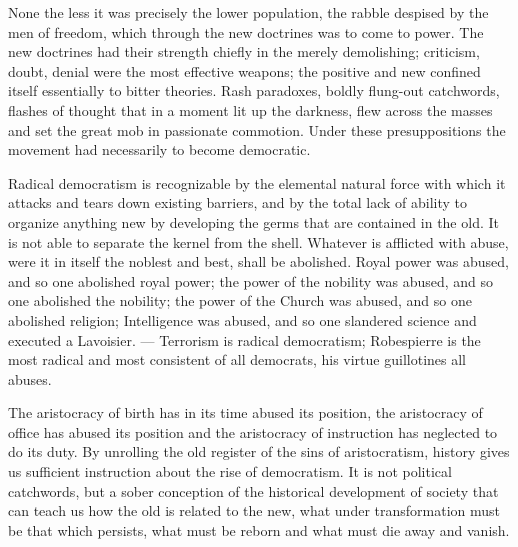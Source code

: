 \documentclass[12pt,a4paper,openany]{book}
\newcommand{\opage}[1]{\marginnote{\footnotesize\textit{[#1]}}}
\begin{document}
\setcounter{footnote}{0}%
\opage{87}None the less it was precisely the lower population,
the rabble despised by the men of freedom, which
through the new doctrines was to come to power. The
new doctrines had their strength chiefly in the
merely demolishing; criticism, doubt, denial were
the most effective weapons; the positive and new confined
itself essentially to bitter theories. Rash paradoxes,
boldly flung-out catchwords, flashes of thought that in a
moment lit up the darkness, flew across the masses and
set the great mob in passionate commotion. Under these
presuppositions the movement had necessarily to become
democratic.

Radical democratism is recognizable by the
elemental natural force with which it attacks and tears down
existing barriers, and by the total lack
of ability to organize anything new by developing
the germs that are contained in the old. It is not able
to separate the kernel from the shell. Whatever is afflicted
with abuse, were it in itself the noblest and
best, shall be abolished. Royal power was abused, and
so one abolished royal power; the power of the nobility was
abused, and so one abolished the nobility; the power of the Church
was abused, and so one abolished religion; Intelligence
was abused, and so one slandered science
and executed a Lavoisier. --- Terrorism is
radical democratism; Robespierre is the most radical
and most consistent of all democrats, his virtue
guillotines all abuses.

The aristocracy of birth has in its time abused its
position, the aristocracy of office has abused its position
and the aristocracy of instruction has neglected to do
\setcounter{footnote}{0}%
\opage{88}its duty. By unrolling the old register of the sins
of aristocratism, history gives us sufficient instruction
about the rise of democratism. It is not political
catchwords, but a sober conception of the historical
development of society that can teach us how
the old is related to the new, what under
transformation must be that which persists, what must be
reborn and what must die away and vanish.
\end{document}
